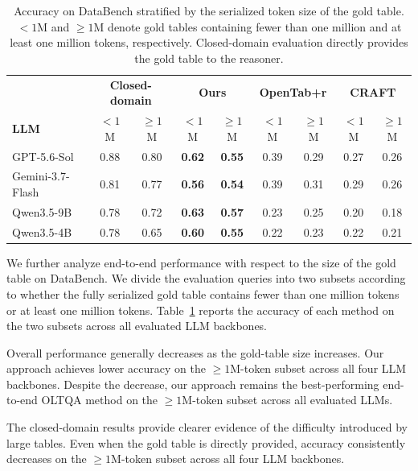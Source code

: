 \begin{table}[t]
\centering
\small
\begin{tabular}{lcccccccc}
\hline
& \multicolumn{2}{c}{\textbf{Closed-domain}}
& \multicolumn{2}{c}{\textbf{Ours}}
& \multicolumn{2}{c}{\textbf{OpenTab+r}}
& \multicolumn{2}{c}{\textbf{CRAFT}} \\
\textbf{LLM}
& $<1$M & $\geq1$M
& $<1$M & $\geq1$M
& $<1$M & $\geq1$M
& $<1$M & $\geq1$M \\
\hline
GPT-5.6-Sol
& 0.88 & 0.80
& \textbf{0.62} & \textbf{0.55}
& 0.39 & 0.29
& 0.27 & 0.26 \\

Gemini-3.7-Flash
& 0.81 & 0.77
& \textbf{0.56} & \textbf{0.54}
& 0.39 & 0.31
& 0.29 & 0.26 \\

Qwen3.5-9B
& 0.78 & 0.72
& \textbf{0.63} & \textbf{0.57}
& 0.23 & 0.25
& 0.20 & 0.18 \\

Qwen3.5-4B
& 0.78 & 0.65
& \textbf{0.60} & \textbf{0.55}
& 0.22 & 0.23
& 0.22 & 0.21 \\
\hline
\end{tabular}
\caption{Accuracy on DataBench stratified by the serialized token size of the gold table. $<1$M and $\geq1$M denote gold tables containing fewer than one million and at least one million tokens, respectively. Closed-domain evaluation directly provides the gold table to the reasoner.}
\label{tab:table_size_analysis}
\end{table}

We further analyze end-to-end performance with respect to the size of the gold table on DataBench.
We divide the evaluation queries into two subsets according to whether the fully serialized gold table contains fewer than one million tokens or at least one million tokens.
Table~\ref{tab:table_size_analysis} reports the accuracy of each method on the two subsets across all evaluated LLM backbones.

Overall performance generally decreases as the gold-table size increases.
Our approach achieves lower accuracy on the $\geq1$M-token subset across all four LLM backbones.
Despite the decrease, our approach remains the best-performing end-to-end OLTQA method on the $\geq1$M-token subset across all evaluated LLMs.

The closed-domain results provide clearer evidence of the difficulty introduced by large tables.
Even when the gold table is directly provided, accuracy consistently decreases on the $\geq1$M-token subset across all four LLM backbones.

